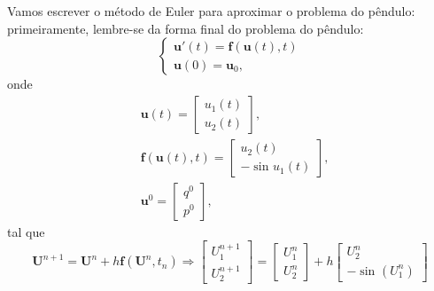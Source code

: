 \documentclass[../differential_methods.tex]{subfiles}
\begin{document}
\begin{example}
	Vamos escrever o método de Euler para aproximar o problema do pêndulo: primeiramente, lembre-se da forma final do problema do pêndulo:
	\[
		\left\{\begin{array}{ll}
			\mathbf{u}'(t) = \mathbf{f}(\mathbf{u}(t), t) \\
			\mathbf{u}(0) = \mathbf{u}_{0},
		\end{array}\right.
	\]
	onde
	\begin{align*}
		 & \mathbf{u}(t) = \begin{bmatrix}
			                   u_1(t) \\
			                   u_2(t)
		                   \end{bmatrix},                 \\
		 & \mathbf{f}(\mathbf{u}(t), t) = \begin{bmatrix}
			                                  u_2(t) \\
			                                  -\sin^{}{u_1(t)}
		                                  \end{bmatrix}, \\
		 & \mathbf{u}^{0} = \begin{bmatrix}
			                    q^{0} \\
			                    p^{0}
		                    \end{bmatrix},
	\end{align*}
	tal que
	\[
		\mathbf{U}^{n+1} = \mathbf{U}^{n} + h \mathbf{f}(\mathbf{U}^{n}, t_{n}) \Rightarrow \begin{bmatrix}
			U_{1}^{n+1} \\
			U_{2}^{n+1}
		\end{bmatrix} = \begin{bmatrix}
			U_{1}^{n} \\
			U_{2}^{n}
		\end{bmatrix} + h \begin{bmatrix}
			U_{2}^{n} \\
			-\sin^{}{(U_{1}^{n})}
		\end{bmatrix}
	\]
\end{example}
\end{document}
